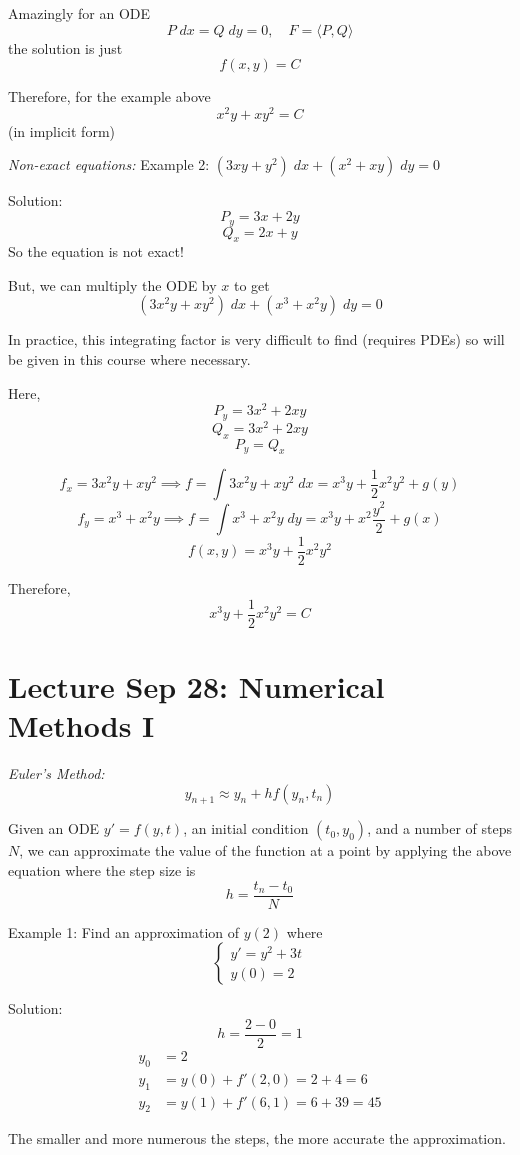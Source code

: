\documentclass[12pt]{article}
\begin{document}
Amazingly for an ODE 
\[P\; dx = Q\; dy = 0, \quad F = \langle P, Q \rangle\]
the solution is just 
\[f(x, y) = C\]

Therefore, for the example above 
\[x^2y + xy^2 = C\]
(in implicit form)

\emph{Non-exact equations:}
Example 2: $(3xy + y^2) \; dx + (x^2 + xy) \; dy = 0$

Solution:
\[P_y = 3x + 2y\]
\[Q_x = 2x + y\]
So the equation is not exact!

But, we can multiply the ODE by $x$ to get 
\[(3x^2 y + xy^2) \; dx + (x^3 + x^2 y) \; dy = 0\]

In practice, this integrating factor is very difficult to find (requires PDEs) so will be given in this course where necessary. 

Here,
\[P_y = 3x^2 + 2xy\]
\[Q_x = 3x^2 + 2xy\]
\[P_y = Q_x\]

\[f_x = 3x^2 y + xy^2 \implies f = \int 3x^2 y + xy^2 \; dx = x^3 y + \frac{1}{2}x^2 y^2 + g(y)\]
\[f_y = x^3 + x^2 y \implies f = \int x^3 + x^2 y \; dy = x^3 y + x^2 \frac{y^2}{2} + g(x)\]
\[f(x, y) = x^3 y + \frac{1}{2}x^2 y^2\]

Therefore, 
\[\boxed{x^3 y + \frac{1}{2}x^2 y^2 = C}\]

\section{Lecture Sep 28: Numerical Methods I}
\emph{Euler's Method:}
\[y_{n + 1} \approx y_n + h f(y_n, t_n)\]

Given an ODE $y' = f(y, t)$, an initial condition $(t_0, y_0)$, and a number of steps $N$, we can approximate the value of the function at a point by applying the above equation where the step size is  
\[h = \frac{t_n - t_0}{N}\] 

Example 1: Find an approximation of $y(2)$ where 
\[\begin{cases}
    y' = y^2 + 3t\\
    y(0) = 2
\end{cases}\]

Solution:
\[h = \frac{2 - 0}{2} = 1\]
\begin{align*}
    y_0 &= 2\\
    y_1 &= y(0) + f'(2, 0) = 2 + 4 = 6\\
    y_2 &= y(1) + f'(6, 1) = 6 + 39 = 45
\end{align*}

The smaller and more numerous the steps, the more accurate the approximation. 
\end{document}
